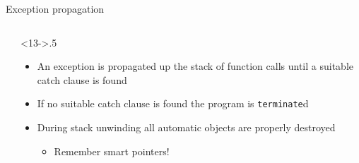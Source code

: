 \begin{frame}[fragile]{Exception propagation}

  \begin{columns}[t]

    \begin{column}{.5\textwidth}
      \begin{codeblock}


\end{codeblock}
    \end{column}

    \begin{column}<13->{.5\textwidth}
      \begin{itemize}
      \item An exception is propagated up the stack of function calls until a
        suitable catch clause is found
      \item If no suitable catch clause is found the program is
        \texttt{terminate}d
      \item During stack unwinding all automatic objects are properly destroyed
        \begin{itemize}
        \item Remember smart pointers!
        \end{itemize}
      \end{itemize}
    \end{column}

  \end{columns}
\end{frame}

